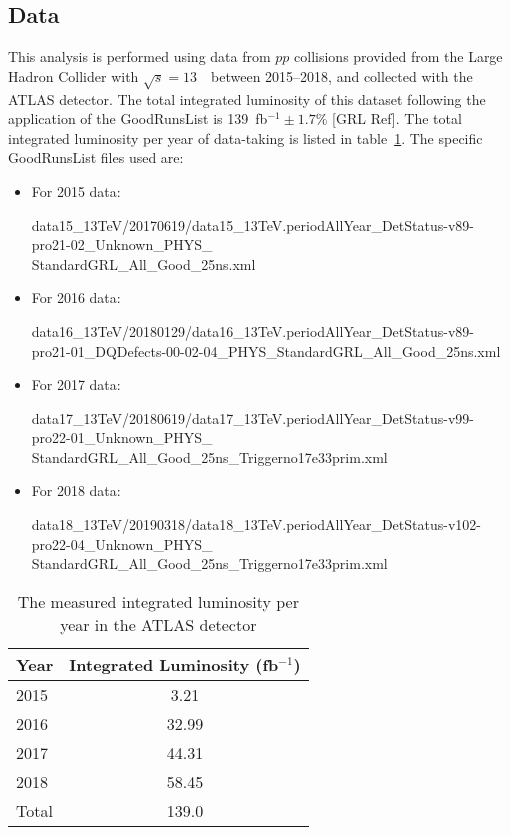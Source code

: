 \subsection{Data}

This analysis is performed using data from $pp$ collisions provided from the Large Hadron Collider with $\sqrt{s} = 13$~\TeV~between 2015--2018, and collected with the ATLAS detector. The total integrated luminosity of this dataset following the application of the GoodRunsList is 139~fb$^{-1}\pm1.7\%$ [GRL Ref]. The total integrated luminosity per year of data-taking is listed in table~\ref{tab:LumiYear}. The specific GoodRunsList files used are:

\begin{itemize}
    \item For 2015 data:

    data15\_13TeV/20170619/data15\_13TeV.periodAllYear\_DetStatus-v89-pro21-02\_Unknown\_PHYS\_\\
    StandardGRL\_All\_Good\_25ns.xml
    \item For 2016 data:

    data16\_13TeV/20180129/data16\_13TeV.periodAllYear\_DetStatus-v89-pro21-01\_DQDefects-00-02-04\_PHYS\_StandardGRL\_All\_Good\_25ns.xml
    \item For 2017 data:

    data17\_13TeV/20180619/data17\_13TeV.periodAllYear\_DetStatus-v99-pro22-01\_Unknown\_PHYS\_ \\
    StandardGRL\_All\_Good\_25ns\_Triggerno17e33prim.xml
    \item For 2018 data:

    data18\_13TeV/20190318/data18\_13TeV.periodAllYear\_DetStatus-v102-pro22-04\_Unknown\_PHYS\_ \\
    StandardGRL\_All\_Good\_25ns\_Triggerno17e33prim.xml
\end{itemize}

\begin{table}[h!]
    \centering
    \begin{tabular}{l|c}
    \hline
    \textbf{Year} & \textbf{Integrated Luminosity (fb$^{-1}$)} \\ \hline
    2015 &  3.21 \\\hline
    2016 &  32.99 \\\hline
    2017 &  44.31 \\ \hline
    2018 &  58.45 \\ \hline\hline
    Total & 139.0 \\ \hline
    \end{tabular}
    \caption{The measured integrated luminosity per year in the ATLAS detector}
    \label{tab:LumiYear}
\end{table}

